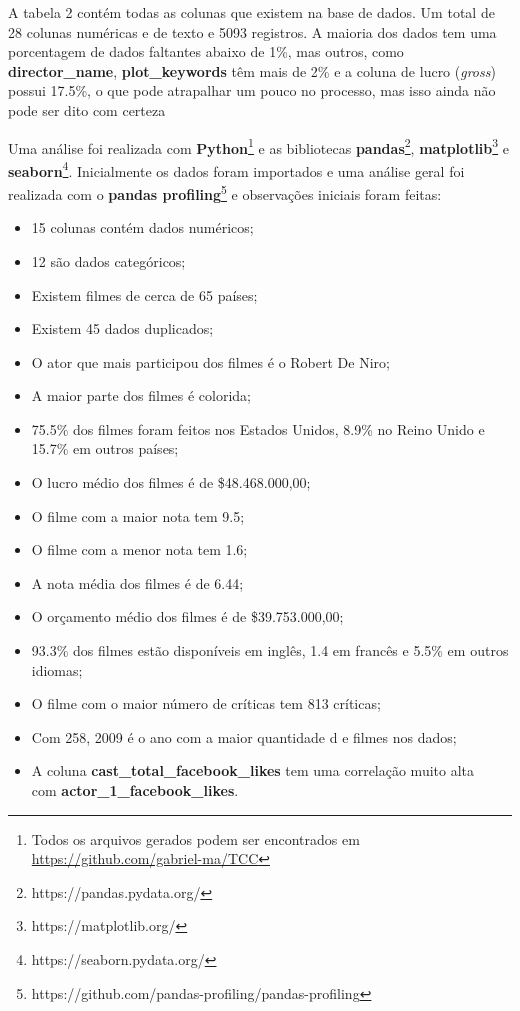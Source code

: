 A tabela 2 contém todas as colunas que existem na base de dados. Um total de 28 colunas numéricas e de texto e 5093 registros. A maioria dos dados tem uma porcentagem de dados faltantes abaixo de 1\%, mas outros, como \textbf{director\_name}, \textbf{plot\_keywords} têm mais de 2\% e a coluna de lucro (\textit{gross}) possui 17.5\%, o que pode atrapalhar um pouco no processo, mas isso ainda não pode ser dito com certeza


Uma análise foi realizada com \textbf{Python}\footnote{Todos os arquivos gerados podem ser encontrados em \url{https://github.com/gabriel-ma/TCC}} e as bibliotecas \textbf{pandas}\footnote{https://pandas.pydata.org/}, \textbf{matplotlib}\footnote{https://matplotlib.org/} e \textbf{seaborn}\footnote{https://seaborn.pydata.org/}. Inicialmente os dados foram importados e uma análise geral foi realizada com o \textbf{pandas profiling}\footnote{https://github.com/pandas-profiling/pandas-profiling} e observações iniciais foram feitas:
\begin{itemize}
    \item 15 colunas contém dados numéricos;
    \item 12 são dados categóricos;
    \item Existem filmes de cerca de 65 países;
    \item Existem 45 dados duplicados;
    \item O ator que mais participou dos filmes é o Robert De Niro;
    \item A maior parte dos filmes é colorida;
    \item 75.5\% dos filmes foram feitos nos Estados Unidos, 8.9\% no Reino Unido e 15.7\% em outros países;
    \item O lucro médio dos filmes é de \$48.468.000,00;
    \item O filme com a maior nota tem 9.5;
    \item O filme com a menor nota tem 1.6;
    \item A nota média dos filmes é de 6.44;
    \item O orçamento médio dos filmes é de \$39.753.000,00;
    \item 93.3\% dos filmes estão disponíveis em inglês, 1.4 em francês e 5.5\% em outros idiomas;
    \item O filme com o maior número de críticas tem 813 críticas;
    \item Com 258, 2009 é o ano com a maior quantidade d
    e filmes nos dados;
    \item A coluna \textbf{cast\_total\_facebook\_likes} tem uma correlação muito alta\\ com \textbf{actor\_1\_facebook\_likes}.
\end{itemize}

